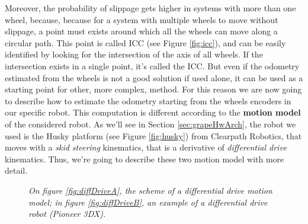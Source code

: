 Moreover, the probability of slippage gets higher in systems with more than one wheel, because, because for a system with multiple wheels to move without slippage, a point must exists around which all the wheels can move along a circular path. This point is called \ac{ICC} (see Figure \ref{fig:icc}), and can be easily identified by looking for the intersection of the axis of all wheels. If the intersection exists in a single point, it's called the \ac{ICC}.
But even if the odometry estimated from the wheels is not a good solution if used alone, it can be used as a starting point for other, more complex, method. For this reason we are now going to describe how to estimate the odometry starting from the wheels encoders in our specific robot. This computation is different according to the \textbf{motion model} of the considered robot. As we'll see in Section \ref{sec:grapeHwArch}, the robot we used is the Husky platform (see Figure \ref{fig:husky}) from Clearpath Robotics, that moves with a  \textit{skid steering} kinematics, that is a derivative of \textit{differential drive} kinematics. Thus, we're going to describe these two motion model with more detail.

\begin{figure}
	\centering
	\qquad
	\caption{\textit{On figure \ref{fig:diffDriveA}, the scheme of a differential drive motion model; in figure \ref{fig:diffDriveB}, an example of a differential drive robot (Pioneer 3DX).}}
	\label{fig:diffDrive}
\end{figure}

